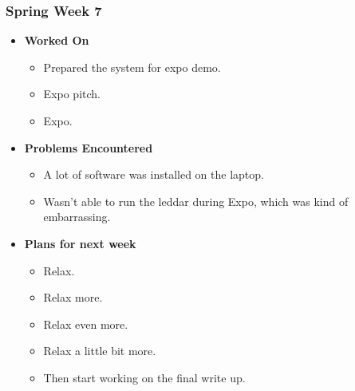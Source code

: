 \documentclass{article}
\begin{document}
\subsubsection{Spring Week 7}
\begin{itemize}
    \item {\textbf{Worked On}}
    \begin{itemize}
      \item Prepared the system for expo demo.
      \item Expo pitch.
      \item Expo.
    \end{itemize}

    \item {\textbf{Problems Encountered}}
    \begin{itemize}
      \item A lot of software was installed on the laptop.
      \item Wasn't able to run the leddar during Expo, which was kind
      of embarrassing.
    \end{itemize}

    \item{\textbf{Plans for next week}}
    \begin{itemize}
      \item Relax.
      \item Relax more.
      \item Relax even more.
      \item Relax a little bit more.
      \item Then start working on the final write up.
    \end{itemize}

\end{itemize}
\end{document}
